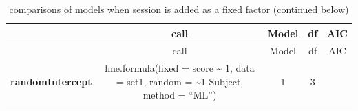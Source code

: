 \documentclass[]{article}
\begin{document}
\begin{longtable}[]{@{}ccccc@{}}
\caption{comparisons of models when session is added as a fixed factor
(continued below)}\tabularnewline
\toprule
\begin{minipage}[b]{0.25\columnwidth}\centering\strut
~\strut
\end{minipage} & \begin{minipage}[b]{0.37\columnwidth}\centering\strut
call\strut
\end{minipage} & \begin{minipage}[b]{0.09\columnwidth}\centering\strut
Model\strut
\end{minipage} & \begin{minipage}[b]{0.06\columnwidth}\centering\strut
df\strut
\end{minipage} & \begin{minipage}[b]{0.09\columnwidth}\centering\strut
AIC\strut
\end{minipage}\tabularnewline
\midrule
\endfirsthead
\toprule
\begin{minipage}[b]{0.25\columnwidth}\centering\strut
~\strut
\end{minipage} & \begin{minipage}[b]{0.37\columnwidth}\centering\strut
call\strut
\end{minipage} & \begin{minipage}[b]{0.09\columnwidth}\centering\strut
Model\strut
\end{minipage} & \begin{minipage}[b]{0.06\columnwidth}\centering\strut
df\strut
\end{minipage} & \begin{minipage}[b]{0.09\columnwidth}\centering\strut
AIC\strut
\end{minipage}\tabularnewline
\midrule
\endhead
\begin{minipage}[t]{0.25\columnwidth}\centering\strut
\textbf{randomIntercept}\strut
\end{minipage} & \begin{minipage}[t]{0.37\columnwidth}\centering\strut
lme.formula(fixed = score \textasciitilde{} 1, data = set1, random =
\textasciitilde{}1 \textbar{} Subject, method = ``ML'')\strut
\end{minipage} & \begin{minipage}[t]{0.09\columnwidth}\centering\strut
1\strut
\end{minipage} & \begin{minipage}[t]{0.06\columnwidth}\centering\strut
3\strut
\end{minipage} & \begin{minipage}[t]{0.09\columnwidth}\centering\strut

\end{minipage}
\end{longtable}
\end{document}
